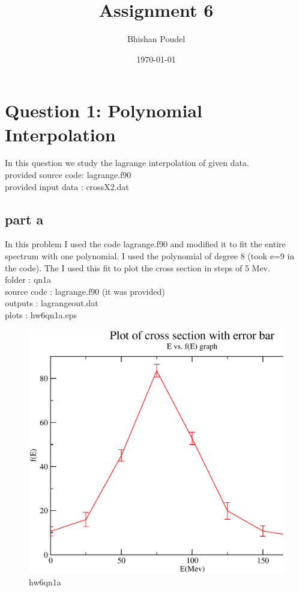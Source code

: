 \documentclass[11pt,a4paper,english]{article}
\title{Assignment 6}
\author{Bhishan Poudel}
\date{\today}
\begin{document}
\maketitle
\tableofcontents
\listoffigures
\clearpage


\section{Question 1: Polynomial Interpolation}
In this question we study the lagrange interpolation of given data.\\
provided source code: lagrange.f90\\
provided input data : crossX2.dat\\
 

	
	\subsection{part a}
	
In this problem I used the code lagrange.f90 and modified it to fit the entire spectrum with one polynomial. I used the polynomial of degree 8 (took e=9 in the code). The I used this fit to plot the cross section in steps of 5 Mev.\\
    folder       : qn1a\\
	source code  : lagrange.f90 (it was provided)\\
	outputs      : lagrangeout.dat\\
	plots        : hw6qn1a.eps\\
	
	\begin{figure}[h!]
	\centering
	\includegraphics [scale=0.6]{hw6qn1a.eps}
	\caption{hw6qn1a }
	\end{figure}
	\clearpage
	
\end{document}
